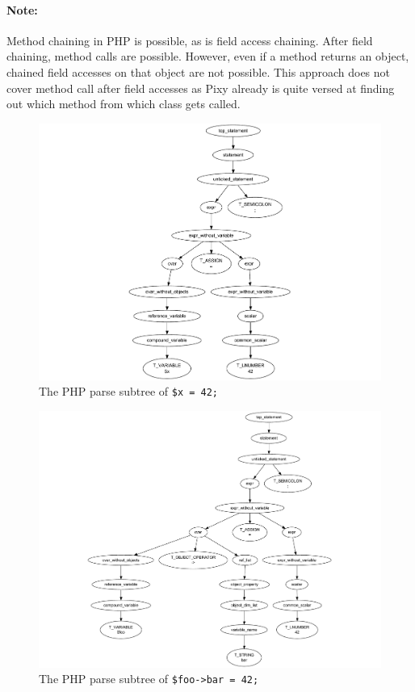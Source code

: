 \paragraph{Note:} Method chaining in PHP is possible, as is field access chaining. After field chaining, method calls are possible. However, even if a method returns an object, chained field accesses on that object are not possible. This approach does not cover method call after field accesses as Pixy already is quite versed at finding out which method from which class gets called.


\begin{figure}[htb]
  \begin{center}
    \includegraphics[scale=.7, trim=30mm 0mm 0mm 0mm]{images/simple-variable-assignment}
    \caption{The PHP parse subtree of \texttt{\$x = 42;}}
    \label{fig:simple-variable-assignment}
  \end{center}
\end{figure}

\begin{figure}[htb]
  \begin{center}
    \includegraphics[scale=.73, trim=40mm 0mm 0mm 0mm]{images/one-level-field-access-left}
    \caption{The PHP parse subtree of \texttt{\$foo->bar = 42;}}
    \label{fig:one-level-field-access-left}
  \end{center}
\end{figure}

